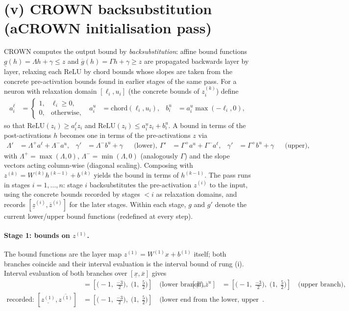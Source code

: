 \documentclass[11pt]{article}
\begin{document}
\section{(v) CROWN backsubstitution (aCROWN initialisation pass)}
CROWN computes the output bound by \emph{backsubstitution}: affine bound functions
$\underline{g}(h) = \Lambda h + \gamma \le z$ and $\overline{g}(h) = \Gamma h + \gamma \ge z$
are propagated backwards layer by layer, relaxing each ReLU by chord bounds whose slopes are taken
from the concrete pre-activation bounds found in earlier stages of the same pass. For a neuron with
relaxation domain $[\ell_i, u_i]$ (the concrete bounds of $z^{(k)}_i$) define
\begin{align*}
a^{\ell}_i &= \begin{cases} 1, & \ell_i \ge 0,\\ 0, & \text{otherwise}, \end{cases} & a^{u}_i &= \mathrm{chord}(\ell_i, u_i), & b^{u}_i &= a^{u}_i \max(-\ell_i, 0),
\end{align*}
so that $\mathrm{ReLU}(z_i) \ge a^{\ell}_i z_i$ and
$\mathrm{ReLU}(z_i) \le a^{u}_i z_i + b^{u}_i$. A bound in terms of the post-activations $h$ becomes
one in terms of the pre-activations $z$ via
\begin{align*}
\Lambda' &= \Lambda^{+} a^{\ell} + \Lambda^{-} a^{u}, & \gamma' &= \Lambda^{-} b^{u} + \gamma && \text{(lower)}, \
\Gamma' &= \Gamma^{+} a^{u} + \Gamma^{-} a^{\ell}, & \gamma' &= \Gamma^{+} b^{u} + \gamma && \text{(upper)},
\end{align*}
with $\Lambda^{+} = \max(\Lambda, 0)$, $\Lambda^{-} = \min(\Lambda, 0)$ (analogously $\Gamma$) and the
slope vectors acting column-wise (diagonal scaling). Composing with
$z^{(k)} = W^{(k)} h^{(k-1)} + b^{(k)}$ yields the bound in terms of $h^{(k-1)}$. The pass runs in
stages $i = 1, \dots, n$: stage $i$ backsubstitutes the pre-activation $z^{(i)}$ to the input, using
the concrete bounds recorded by stages $< i$ as relaxation domains, and records
$[\underline{z}^{(i)}, \overline{z}^{(i)}]$ for the later stages. Within each stage, $g$ and $g'$
denote the current lower/upper bound functions (redefined at every step).
\paragraph{Stage 1: bounds on $z^{(1)}$.}
The bound functions are the layer map $z^{(1)} = W^{(1)} x + b^{(1)}$ itself; both branches coincide and their interval evaluation is the interval bound of rung (i).
Interval evaluation of both branches over $[\underline{x}, \overline{x}]$ gives
\begin{align*}
[\underline{z}^{\ell}, \overline{z}^{\ell}] &= [\bigl(-1,\; \frac{-3}{2}\bigr),\; \bigl(1,\; \frac{5}{2}\bigr)] \quad\text{(lower branch)}, & [\underline{z}^{u}, \overline{z}^{u}] &= [\bigl(-1,\; \frac{-3}{2}\bigr),\; \bigl(1,\; \frac{5}{2}\bigr)] \quad\text{(upper branch)}, \\
\text{recorded: } [\underline{z^{(1)}}, \overline{z^{(1)}}] &= [\bigl(-1,\; \frac{-3}{2}\bigr),\; \bigl(1,\; \frac{5}{2}\bigr)] \quad\text{(lower end from the lower, upper end from the upper branch)}.
\end{align*}
\end{document}
